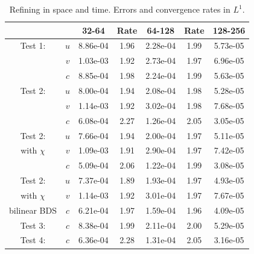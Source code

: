 \documentclass[final]{siamltex}
\begin{document}
\begin{table}[h]
\begin{center}
\caption{Refining in space and time.  Errors and convergence rates in $L^1$.}
\begin{tabular}{ccccccc}
& & 32-64 & Rate & 64-128 & Rate & 128-256 \\
\hline
Test 1:             & $u$ & 8.86e-04 & 1.96 & 2.28e-04 & 1.99 & 5.73e-05 \\
                    & $v$ & 1.03e-03 & 1.92 & 2.73e-04 & 1.97 & 6.96e-05 \\
                    & $c$ & 8.85e-04 & 1.98 & 2.24e-04 & 1.99 & 5.63e-05 \\
\hline
Test 2:             & $u$ & 8.00e-04 & 1.94 & 2.08e-04 & 1.98 & 5.28e-05 \\
                    & $v$ & 1.14e-03 & 1.92 & 3.02e-04 & 1.98 & 7.68e-05 \\
                    & $c$ & 6.08e-04 & 2.27 & 1.26e-04 & 2.05 & 3.05e-05 \\
\hline
Test 2:             & $u$ & 7.66e-04 & 1.94 & 2.00e-04 & 1.97 & 5.11e-05 \\
with $\chi$         & $v$ & 1.09e-03 & 1.91 & 2.90e-04 & 1.97 & 7.42e-05 \\
                    & $c$ & 5.09e-04 & 2.06 & 1.22e-04 & 1.99 & 3.08e-05 \\
\hline
Test 2:             & $u$ & 7.37e-04 & 1.89 & 1.93e-04 & 1.97 & 4.93e-05 \\
with $\chi$         & $v$ & 1.14e-03 & 1.92 & 3.01e-04 & 1.97 & 7.67e-05 \\
bilinear BDS        & $c$ & 6.21e-04 & 1.97 & 1.59e-04 & 1.96 & 4.09e-05 \\
\hline
Test 3:             & $c$ & 8.38e-04 & 1.99 & 2.11e-04 & 2.00 & 5.29e-05 \\
\hline
Test 4:             & $c$ & 6.36e-04 & 2.28 & 1.31e-04 & 2.05 & 3.16e-05
\end{tabular}
\end{center}
\end{table}
\end{document}
